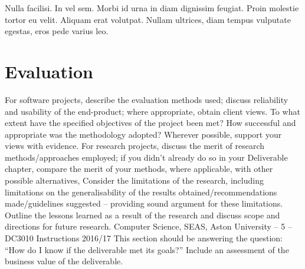 \begin{savequote}[75mm]
Nulla facilisi. In vel sem. Morbi id urna in diam dignissim feugiat. Proin molestie tortor eu velit. Aliquam erat volutpat. Nullam ultrices, diam tempus vulputate egestas, eros pede varius leo.
\end{savequote}

\chapter{Evaluation}

For software projects, describe the evaluation methods used; discuss reliability
and usability of the end-product; where appropriate, obtain client views. To
what extent have the specified objectives of the project been met? How
successful and appropriate was the methodology adopted? Wherever possible,
support your views with evidence.
For research projects, discuss the merit of research methods/approaches
employed; if you didn’t already do so in your Deliverable chapter, compare the
merit of your methods, where applicable, with other possible alternatives,
Consider the limitations of the research, including limitations on the
generalisability of the results obtained/recommendations made/guidelines
suggested – providing sound argument for these limitations. Outline the
lessons learned as a result of the research and discuss scope and directions for
future research.
Computer Science, SEAS, Aston University – 5 – DC3010 Instructions 2016/17
This section should be answering the question: “How do I know if the
deliverable met its goals?”
Include an assessment of the business value of the deliverable.

